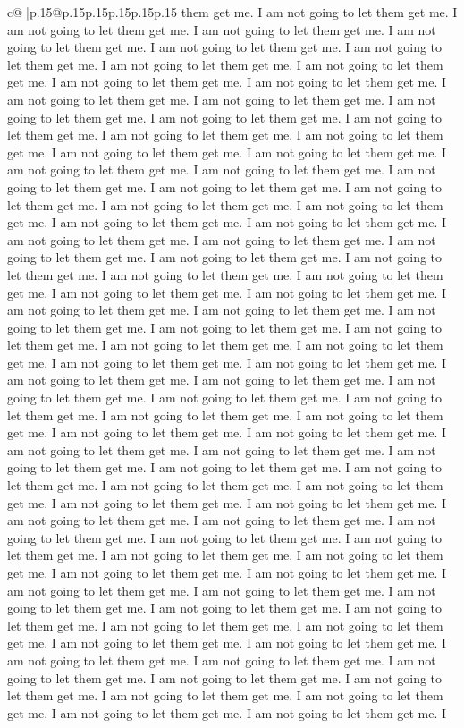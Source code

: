 \documentclass{article}
\begin{document}
{\begin{supertabular}{c@{$\;$}|p{.15\linewidth}@{}p{.15\linewidth}p{.15\linewidth}p{.15\linewidth}p{.15\linewidth}p{.15\linewidth}}
{{{them get me. I am not going to let them get me. I am not going to let them get me. I am not going to let them get me. I am not going to let them get me. I am not going to let them get me. I am not going to let them get me. I am not going to let them get me. I am not going to let them get me. I am not going to let them get me. I am not going to let them get me. I am not going to let them get me. I am not going to let them get me. I am not going to let them get me. I am not going to let them get me. I am not going to let them get me. I am not going to let them get me. I am not going to let them get me. I am not going to let them get me. I am not going to let them get me. I am not going to let them get me. I am not going to let them get me. I am not going to let them get me. I am not going to let them get me. I am not going to let them get me. I am not going to let them get me. I am not going to let them get me. I am not going to let them get me. I am not going to let them get me. I am not going to let them get me. I am not going to let them get me. I am not going to let them get me. I am not going to let them get me. I am not going to let them get me. I am not going to let them get me. I am not going to let them get me. I am not going to let them get me. I am not going to let them get me. I am not going to let them get me. I am not going to let them get me. I am not going to let them get me. I am not going to let them get me. I am not going to let them get me. I am not going to let them get me. I am not going to let them get me. I am not going to let them get me. I am not going to let them get me. I am not going to let them get me. I am not going to let them get me. I am not going to let them get me. I am not going to let them get me. I am not going to let them get me. I am not going to let them get me. I am not going to let them get me. I am not going to let them get me. I am not going to let them get me. I am not going to let them get me. I am not going to let them get me. I am not going to let them get me. I am not going to let them get me. I am not going to let them get me. I am not going to let them get me. I am not going to let them get me. I am not going to let them get me. I am not going to let them get me. I am not going to let them get me. I am not going to let them get me. I am not going to let them get me. I am not going to let them get me. I am not going to let them get me. I am not going to let them get me. I am not going to let them get me. I am not going to let them get me. I am not going to let them get me. I am not going to let them get me. I am not going to let them get me. I am not going to let them get me. I am not going to let them get me. I am not going to let them get me. I am not going to let them get me. I am not going to let them get me. I am not going to let them get me. I am not going to let them get me. I am not going to let them get me. I am not going to let them get me. I am not going to let them get me. I am not going to let them get me. I am not going to let them get me. I am not going to let them get me. I am not going to let them get me. I am not going to let them get me. I am not going to let them get me. I }}}
\end{supertabular}}
\end{document}
